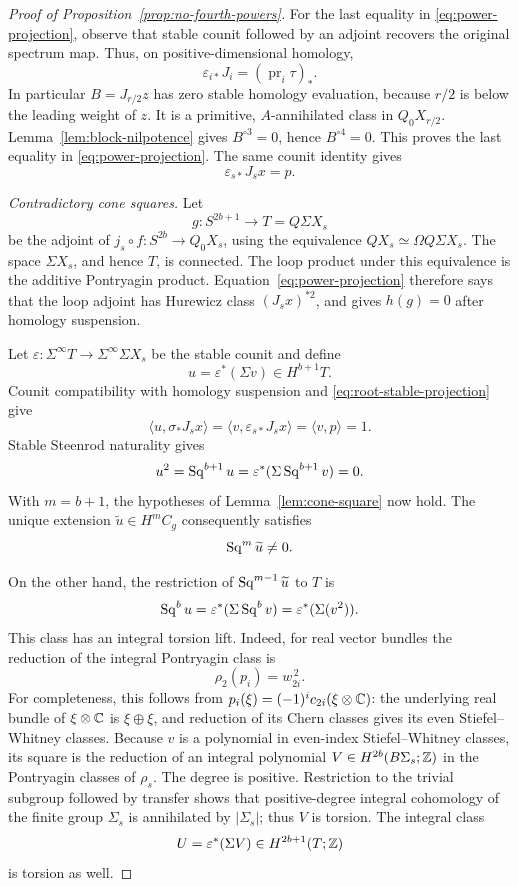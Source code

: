 \begin{proof}[Proof of Proposition~\ref{prop:no-fourth-powers}]
For the last equality in \eqref{eq:power-projection}, observe that
stable counit followed by an adjoint recovers the original spectrum
map.  Thus, on positive-dimensional homology,
\begin{equation}
\label{eq:projected-counit}
 \varepsilon_{i*}J_i=(\operatorname{pr}_i\tau)_*.
\end{equation}
In particular \(B=J_{r/2}z\) has zero stable homology evaluation,
because \(r/2\) is below the leading weight of \(z\). It is a
primitive, \(A\)-annihilated class in \(Q_0X_{r/2}\).
Lemma~\ref{lem:block-nilpotence} gives \(B^{\circ3}=0\), hence
\(B^{\circ4}=0\). This proves the last equality in
\eqref{eq:power-projection}.
The same counit identity gives
\begin{equation}
\label{eq:root-stable-projection}
 \varepsilon_{s*}J_sx=p.
\end{equation}

\emph{Contradictory cone squares.}
Let
\[
 g:S^{2b+1}\longrightarrow T=Q\Sigma X_s
\]
be the adjoint of $j_s\circ f:S^{2b}\to Q_0X_s$, using the
equivalence $QX_s\simeq\Omega Q\Sigma X_s$.
The space $\Sigma X_s$, and hence $T$, is connected.
The loop product under this equivalence is the additive Pontryagin
product.  Equation~\eqref{eq:power-projection} therefore says that
the loop adjoint has Hurewicz class $(J_sx)^{*2}$, and gives
$h(g)=0$ after homology suspension.

Let $\varepsilon:\Sigma^\infty T\to\Sigma^\infty\Sigma X_s$ be
the stable counit and define
\[
 u=\varepsilon^*(\Sigma v)\in H^{b+1}T.
\]
Counit compatibility with homology suspension and
\eqref{eq:root-stable-projection} give
\[
 \langle u,\sigma_*J_sx\rangle
   =\langle v,\varepsilon_{s*}J_sx\rangle
   =\langle v,p\rangle=1.
\]
Stable Steenrod naturality gives
\[
 u^2=\operatorname{Sq}^{b+1}u
 =\varepsilon^*(\Sigma\operatorname{Sq}^{b+1}v)=0.
\]
With $m=b+1$, the hypotheses of Lemma~\ref{lem:cone-square} now hold.
The unique extension $\widetilde u\in H^mC_g$ consequently satisfies
\begin{equation}
\label{eq:nonzero-power-cone-square}
 \operatorname{Sq}^m\widetilde u\ne0.
\end{equation}

On the other hand, the restriction of
$\operatorname{Sq}^{m-1}\widetilde u$ to $T$ is
\[
 \operatorname{Sq}^b u=\varepsilon^*(\Sigma\operatorname{Sq}^b v)
        =\varepsilon^*(\Sigma(v^2)).
\]
This class has an integral torsion lift.  Indeed, for real vector
bundles the reduction of the integral Pontryagin class is
\[
 \rho_2(p_i)=w_{2i}^{\,2}.
\]
For completeness, this follows from
$p_i(\xi)=(-1)^ic_{2i}(\xi\otimes\mathbb C)$: the underlying real bundle
of $\xi\otimes\mathbb C$ is $\xi\oplus\xi$, and reduction of its Chern
classes gives its even Stiefel--Whitney classes.
Because $v$ is a polynomial in even-index Stiefel--Whitney classes,
its square is the reduction of an integral polynomial
$V\in H^{2b}(B\Sigma_s;\mathbb Z)$ in the Pontryagin classes of $\rho_s$.
The degree is positive.  Restriction to the trivial subgroup followed
by transfer shows that positive-degree integral cohomology of the
finite group $\Sigma_s$ is annihilated by $|\Sigma_s|$; thus $V$ is
torsion.  The integral class
\[
 U=\varepsilon^*(\Sigma V)\in H^{2b+1}(T;\mathbb Z)
\]
is torsion as well.


\end{proof}
